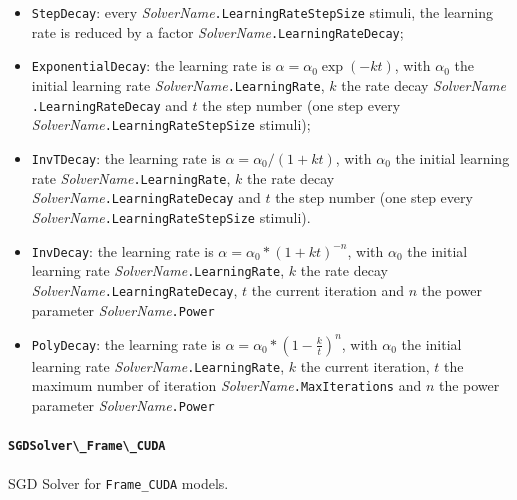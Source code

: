 \documentclass[a4paper,11pt,oneside]{article}
\newenvironment{myitemize}
{ \begin{itemize}
    \setlength{\itemsep}{0pt}
    \setlength{\parskip}{0pt}
    \setlength{\parsep}{0pt}     }
{ \end{itemize}                  }
\begin{document}
\begin{myitemize}
\item \lstinline!StepDecay!: every
\emph{SolverName}\lstinline!.LearningRateStepSize! stimuli, the learning rate
is reduced by a factor \emph{SolverName}\lstinline!.LearningRateDecay!; \\
\item \lstinline!ExponentialDecay!: the learning rate is
$\alpha = \alpha_{0}\exp(-k t)$, with $\alpha_{0}$ the initial learning rate
\emph{SolverName}\lstinline!.LearningRate!, $k$ the rate decay \emph{SolverName}
\lstinline!.LearningRateDecay! and $t$ the step number (one step every
 \emph{SolverName}\lstinline!.LearningRateStepSize! stimuli); \\
\item \lstinline!InvTDecay!: the learning rate is
$\alpha = \alpha_{0} / (1 + k t)$, with $\alpha_{0}$ the initial learning rate
 \emph{SolverName}\lstinline!.LearningRate!, $k$ the rate decay
 \emph{SolverName}\lstinline!.LearningRateDecay! and $t$ the step number
 (one step every \emph{SolverName}\lstinline!.LearningRateStepSize! stimuli). \\
 \item \lstinline!InvDecay!: the learning rate is
$\alpha = \alpha_{0} * (1 + k t)^{-n}$, with $\alpha_{0}$ the initial
learning rate \emph{SolverName}\lstinline!.LearningRate!, $k$ the rate decay
\emph{SolverName}\lstinline!.LearningRateDecay!,
$t$ the current iteration and $n$ the power parameter
\emph{SolverName}\lstinline!.Power! \\
\item \lstinline!PolyDecay!: the learning rate is
$\alpha = \alpha_{0} * (1 - \frac{k}{t})^n$, with $\alpha_{0}$ the initial
learning rate \emph{SolverName}\lstinline!.LearningRate!, $k$ the current
iteration, $t$ the maximum number of iteration
\emph{SolverName}\lstinline!.MaxIterations! and $n$ the power parameter
\emph{SolverName}\lstinline!.Power! \\
\end{myitemize}


\paragraph{\texorpdfstring{%
\lstinline[basicstyle=\ttfamily\bfseries]!SGDSolver\_Frame\_CUDA!}
{SGDSolver\_Frame\_CUDA}}
SGD Solver for \lstinline!Frame_CUDA! models.
\end{document}
